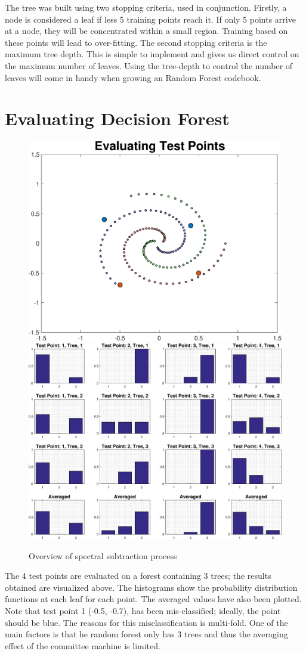 \documentclass[a4paper,pra,twocolumn,10pt,aps,longbibliography,nobalancelastpage]{revtex4-1}
\begin{document}
The tree was built using two stopping criteria, used in conjunction. Firstly, a node is considered a leaf if less 5 training points reach it. If only 5 points arrive at a node, they will be concentrated within a small region. Training based on these points will lead to over-fitting. The second stopping criteria is the maximum tree depth. This is simple to implement and gives us direct control on the maximum number of leaves. Using the tree-depth to control the number of leaves will come in handy when growing an Random Forest codebook.

\section{Evaluating Decision Forest}

\begin{figure}[H]
	\centering
    \includegraphics[width=0.49\columnwidth]{test_points_eval}
    \includegraphics[width=0.49\columnwidth]{test_points_hist}
    \caption{Overview of spectral subtraction process}
    \label{fig:leaf_nodes}
\end{figure}


The 4 test points are evaluated on a forest containing 3 trees; the results obtained are visualized above. The histograms show the probability distribution functions at each leaf for each point. The averaged values have also been plotted. Note that test point 1 (-0.5, -0.7), has been mis-classified; ideally, the point should be blue. The reasons for this misclassification is multi-fold. One of the main factors is that he random forest only has 3 trees and thus the averaging effect of the committee machine is limited.
\end{document}
